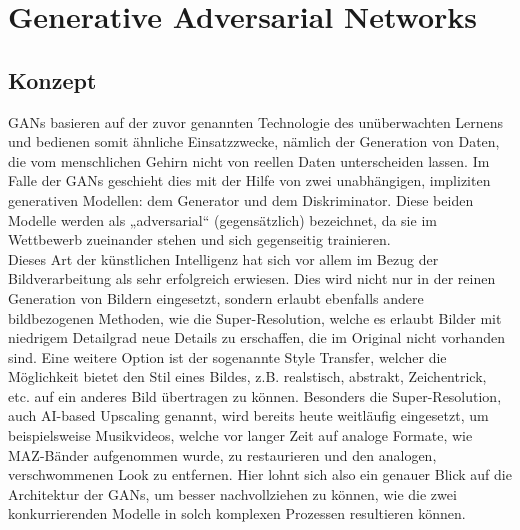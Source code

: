 \chapter{Generative Adversarial Networks}

\section{Konzept}

\noindent \acfp{GAN} basieren auf der zuvor genannten Technologie des unüberwachten Lernens und bedienen somit ähnliche Einsatzzwecke, nämlich der Generation von Daten, die vom menschlichen Gehirn nicht von reellen Daten unterscheiden lassen. Im Falle der \acp{GAN} geschieht dies mit der Hilfe von zwei unabhängigen, impliziten generativen Modellen: dem Generator und dem Diskriminator. Diese beiden Modelle werden als „adversarial“ (gegensätzlich) bezeichnet, da sie im Wettbewerb zueinander stehen und sich gegenseitig trainieren.  \\

\noindent Dieses Art der künstlichen Intelligenz hat sich vor allem im Bezug der Bildverarbeitung als sehr erfolgreich erwiesen. Dies wird nicht nur in der reinen Generation von Bildern eingesetzt, sondern erlaubt ebenfalls andere bildbezogenen Methoden, wie die Super-Resolution, welche es erlaubt Bilder mit niedrigem Detailgrad neue Details zu erschaffen, die im Original nicht vorhanden sind. Eine weitere Option ist der sogenannte Style Transfer, welcher die Möglichkeit bietet den Stil eines Bildes, z.B. realstisch, abstrakt, Zeichentrick, etc. auf ein anderes Bild übertragen zu können. Besonders die Super-Resolution, auch AI-based Upscaling genannt, wird bereits heute weitläufig eingesetzt, um beispielsweise Musikvideos, welche vor langer Zeit auf analoge Formate, wie MAZ-Bänder aufgenommen wurde, zu restaurieren und den analogen, verschwommenen Look zu entfernen. Hier lohnt sich also ein genauer Blick auf die Architektur der \acp{GAN}, um besser nachvollziehen zu können, wie die zwei konkurrierenden Modelle in solch komplexen Prozessen resultieren können.

\newpage